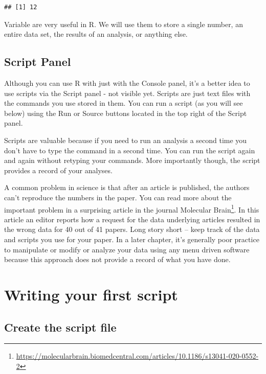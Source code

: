 \documentclass[
]{krantz}
\renewcommand{\href}[2]{#2\footnote{\url{#1}}}
\begin{document}
\begin{verbatim}
## [1] 12
\end{verbatim}

Variable are very useful in R. We will use them to store a single number, an entire data set,
the results of an analysis, or anything else.

\hypertarget{script-panel}{%
\subsection{Script Panel}\label{script-panel}}

Although you can use R with just with the Console panel, it's a better idea to use scripts via the Script panel - not visible yet. Scripts are just text files with the commands you use stored in them. You can run a script (as you will see below) using the Run or Source buttons located in the top right of the Script panel.

Scripts are valuable because if you need to run an analysis a second time you don't have to type the command in a second time. You can run the script again and again without retyping your commands. More importantly though, the script provides a record of your analyses.

A common problem in science is that after an article is published, the authors can't reproduce the numbers in the paper. You can read more about the important problem in a surprising article in the journal \href{https://molecularbrain.biomedcentral.com/articles/10.1186/s13041-020-0552-2}{Molecular Brain}. In this article an editor reports how a request for the data underlying articles resulted in the wrong data for 40 out of 41 papers. Long story short -- keep track of the data and scripts you use for your paper. In a later chapter, it's generally poor practice to manipulate or modify or analyze your data using any menu driven software because this approach does not provide a record of what you have done.

\hypertarget{writing-your-first-script}{%
\section{Writing your first script}\label{writing-your-first-script}}

\hypertarget{create-the-script-file}{%
\subsection{Create the script file}\label{create-the-script-file}}
\end{document}
